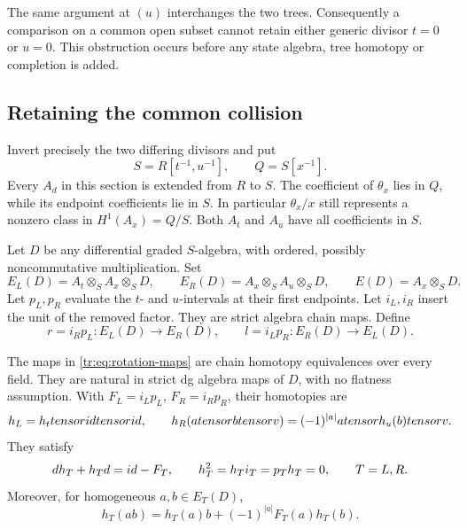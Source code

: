 The same argument at \((u)\) interchanges the two trees.
Consequently a comparison on a common open subset cannot retain
either generic divisor \(t=0\) or \(u=0\).  This obstruction
occurs before any state algebra, tree homotopy or completion is added.

\subsection{Retaining the common collision}

Invert precisely the two differing divisors and put
\[
 S=R[t^{-1},u^{-1}],\qquad Q=S[x^{-1}].
\]
Every \(A_d\) in this section is extended from \(R\) to
\(S\).  The coefficient of \(\theta_x\) lies in \(Q\),
while its endpoint coefficients lie in \(S\).  In particular
\(\theta_x/x\) still represents a nonzero class in
\(H^1(A_x)=Q/S\).  Both \(A_t\) and \(A_u\) have all
coefficients in \(S\).

Let \(D\) be any differential graded \(S\)-algebra, with
ordered, possibly noncommutative multiplication.  Set
\[
 E_L(D)=A_t\otimes_S A_x\otimes_S D,
 \qquad E_R(D)=A_x\otimes_S A_u\otimes_S D,
 \qquad E(D)=A_x\otimes_S D.
\]
Let \(p_L,p_R\) evaluate the \(t\)- and \(u\)-intervals
at their first endpoints.  Let \(i_L,i_R\) insert the unit
of the removed factor.  They are strict algebra chain maps.
Define
\begin{equation}\label{tr:eq:rotation-maps}
 r=i_Rp_L:E_L(D)\longrightarrow E_R(D),\qquad
 l=i_Lp_R:E_R(D)\longrightarrow E_L(D).
\end{equation}

\begin{proposition}
\label{tr:prop:retractions}
The maps in \eqref{tr:eq:rotation-maps} are chain homotopy
equivalences over every field.  They are natural in strict dg
algebra maps of \(D\), with no flatness assumption.  With
\(F_L=i_Lp_L\), \(F_R=i_Rp_R\), their homotopies are
\[
 h_L=h_ttensoridtensorid,
 \qquad
 h_R(atensor btensor v)=(-1)^{|a|}atensor h_u(b)tensor v.
\]
They satisfy
\begin{equation}\label{tr:eq:coefficient-homotopy}
 dh_T+h_Td=id-F_T,\qquad h_T^2=h_Ti_T=p_Th_T=0,
 \qquad T=L,R.
\end{equation}
Moreover, for homogeneous \(a,b\in E_T(D)\),
\begin{equation}\label{tr:eq:twisted-derivation}
 h_T(ab)=h_T(a)b+(-1)^{|a|}F_T(a)h_T(b).
\end{equation}
\end{proposition}

